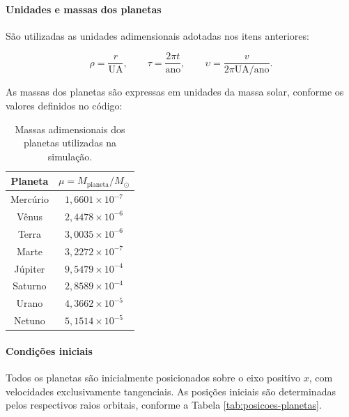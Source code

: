 \documentclass[12pt,a4paper]{article}
\begin{document}
\paragraph{Unidades e massas dos planetas}

São utilizadas as unidades adimensionais adotadas nos itens anteriores:

\begin{equation}
    \rho=\frac{r}{\mathrm{UA}},
    \qquad
    \tau=\frac{2\pi t}{\mathrm{ano}},
    \qquad
    \upsilon=\frac{v}{2\pi\mathrm{UA}/\mathrm{ano}}.
\end{equation}

As massas dos planetas são expressas em unidades da massa solar, conforme os valores definidos no código:

\begin{table}[htbp]
    \centering
    \caption{Massas adimensionais dos planetas utilizadas na simulação.}
    \label{tab:massas-planetas}
    \begin{tabular}{c c}
        \hline
        Planeta & $\mu=M_{\mathrm{planeta}}/M_{\odot}$ \\
        \hline
        Mercúrio & $1,6601\times10^{-7}$ \\
        Vênus & $2,4478\times10^{-6}$ \\
        Terra & $3,0035\times10^{-6}$ \\
        Marte & $3,2272\times10^{-7}$ \\
        Júpiter & $9,5479\times10^{-4}$ \\
        Saturno & $2,8589\times10^{-4}$ \\
        Urano & $4,3662\times10^{-5}$ \\
        Netuno & $5,1514\times10^{-5}$ \\
        \hline
    \end{tabular}
\end{table}

\paragraph{Condições iniciais}

Todos os planetas são inicialmente posicionados sobre o eixo positivo $x$, com velocidades exclusivamente tangenciais. As posições iniciais são determinadas pelos respectivos raios orbitais, conforme a Tabela \ref{tab:posicoes-planetas}.
\end{document}
